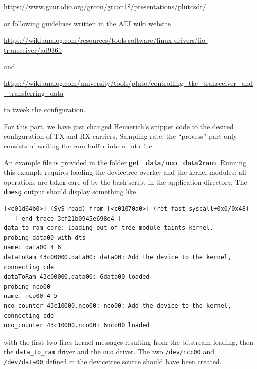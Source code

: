 \documentclass[12pt,oneside]{article}
\begin{document}
\href{https://www.gnuradio.org/grcon/grcon18/presentations/plutosdr/}{https://www.gnuradio.org/grcon/grcon18/presentations/plutosdr/}

or following guidelines written in the ADI wiki website

\href{https://wiki.analog.com/resources/tools-software/linux-drivers/iio-transceiver/ad9361}{https://wiki.analog.com/resources/tools-software/linux-drivers/iio-transceiver/ad9361}

and 

\href{https://wiki.analog.com/university/tools/pluto/controlling\_the\_transceiver\_and\_transferring\_data}{https://wiki.analog.com/university/tools/pluto/controlling\_the\_transceiver\_and\_transferring\_data}

to tweek the configuration.

For this part, we have just changed Hennerich's snippet code to the desired
configuration of TX and RX carriers, Sampling rate, the ``process'' part only
consists of writing the ram buffer into a data file.

An example file is provided in the folder {\bf{get\_data/nco\_data2ram}}. Running this example
requires loading the devicetree overlay and the kernel modules: all operations are taken care
of by the bash script in the application directory. The {\tt dmesg} output should display
something like
{\footnotesize
\begin{verbatim}
[<c01d64b0>] (SyS_read) from [<c01070a0>] (ret_fast_syscall+0x0/0x48)           
---[ end trace 3cf21b0945e698e4 ]---                                            
data_to_ram_core: loading out-of-tree module taints kernel.                     
probing data00 with dts                                                         
name: data00 4 6                                                                
dataToRam 43c00000.data00: data00: Add the device to the kernel, connecting cde 
dataToRam 43c00000.data00: 6data00 loaded                                       
probing nco00                                                                   
name: nco00 4 5                                                                 
nco_counter 43c10000.nco00: nco00: Add the device to the kernel, connecting cde 
nco_counter 43c10000.nco00: 6nco00 loaded                                       
\end{verbatim}
}
with the first two lines kernel messages resulting from the bitstream loading, then the
{\tt data\_to\_ram} driver and the {\tt nco} driver. The two {\tt /dev/nco00} and {\tt /dev/data00}
defined in the devicetree source should have been created.
\end{document}
